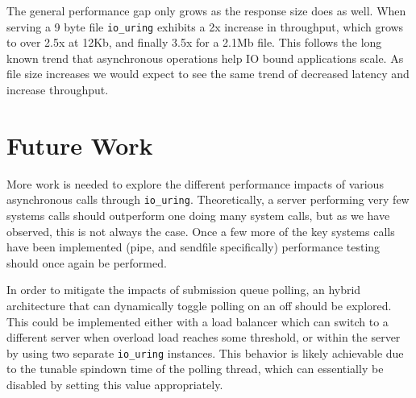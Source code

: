 \documentclass[letterpaper, 10pt, twocolumn]{article}
\begin{document}
The general performance gap only grows as the response size does as well. When serving a 9 byte file \texttt{io\_uring} exhibits a 2x increase in throughput, which grows to over 2.5x at 12Kb, and finally 3.5x for a 2.1Mb file. This follows the long known trend that asynchronous operations help IO bound applications scale. As file size increases we would expect to see the same trend of decreased latency and increase throughput.

\section{Future Work}
\label{sec:org3f713d1}
More work is needed to explore the different performance impacts of various asynchronous calls through \texttt{io\_uring}. Theoretically, a server performing very few systems calls should outperform one doing many system calls, but as we have observed, this is not always the case. Once a few more of the key systems calls have been implemented (pipe, and sendfile specifically) performance testing should once again be performed.

In order to mitigate the impacts of submission queue polling, an hybrid architecture that can dynamically toggle polling on an off should be explored. This could be implemented either with a load balancer which can switch to a different server when overload load reaches some threshold, or within the server by using two separate \texttt{io\_uring} instances. This behavior is likely achievable due to the tunable spindown time of the polling thread, which can essentially be disabled by setting this value appropriately.
\end{document}

